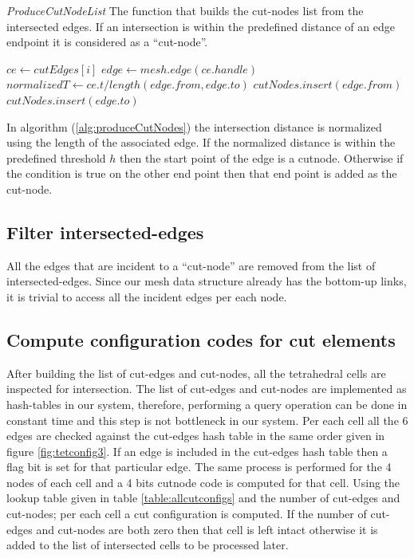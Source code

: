 \begin{algorithm}[H]
\caption{\textit{ProduceCutNodeList} The function that builds the cut-nodes list from the intersected edges.
If an intersection is within the predefined distance of an edge endpoint it is considered as a ``cut-node''.}
\label{alg:produceCutNodes}
\begin{algorithmic}[1]	
  \STATE $ce \gets cutEdges\left[i\right]$
  \STATE $edge \gets mesh.edge(ce.handle)$
  \STATE $normalizedT \gets ce.t / length(edge.from, edge.to)$
  \STATE $cutNodes.insert(edge.from)$
  \ELSE
    \STATE $cutNodes.insert(edge.to)$
    \ENDIF
  \ENDIF
  \ENDFOR
\end{algorithmic}
\end{algorithm}

In algorithm (\ref{alg:produceCutNodes}) the intersection distance is normalized using the length of the associated edge.
If the normalized distance is within the predefined threshold $h$ then the start point of the edge is a cutnode. Otherwise
if the condition is true on the other end point then that end point is added as the cut-node.

\subsection{Filter intersected-edges}
All the edges that are incident to a ``cut-node'' are removed from the list of intersected-edges. Since our mesh data structure 
already has the bottom-up links, it is trivial to access all the incident edges per each node. 


\subsection{Compute configuration codes for cut elements}
After building the list of cut-edges and cut-nodes, all the tetrahedral cells are inspected for intersection. 
The list of cut-edges and cut-nodes are implemented as hash-tables in our system, therefore, performing a query operation can be done 
in constant time and this step is not bottleneck in our system. Per each cell all the 6 edges are checked against the cut-edges hash table 
in the same order given in figure \ref{fig:tetconfig3}. If an edge is included in the cut-edges hash table then a flag bit is set for that
particular edge. The same process is performed for the 4 nodes of each cell and a 4 bits cutnode code is computed for that cell.
Using the lookup table given in table \ref{table:allcutconfigs} and the number of cut-edges and cut-nodes; per each cell a cut configuration
is computed.  If the number of cut-edges and cut-nodes are both zero then that cell is left intact otherwise it is added to the list of intersected cells
to be processed later.

